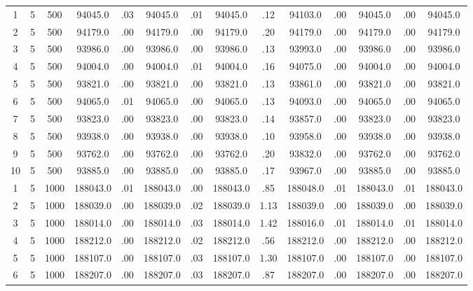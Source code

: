 \documentclass[12pt,a4paper]{article}
\begin{document}
\begin{center}
{\begin{tabular}{|ccc|cc|cc|cc|cc|cc|c|}
1             &   5& 500&  94045.0&  .03&  94045.0&  .01&  94045.0&  .12&  94103.0&  .00&  94045.0&  .00&  94045.0\\[-0.01in]
2             &   5& 500&  94179.0&  .00&  94179.0&  .00&  94179.0&  .20&  94179.0&  .00&  94179.0&  .00&  94179.0\\[-0.01in]
3             &   5& 500&  93986.0&  .00&  93986.0&  .00&  93986.0&  .13&  93993.0&  .00&  93986.0&  .00&  93986.0\\[-0.01in]
4             &   5& 500&  94004.0&  .00&  94004.0&  .01&  94004.0&  .16&  94075.0&  .00&  94004.0&  .00&  94004.0\\[-0.01in]
5             &   5& 500&  93821.0&  .00&  93821.0&  .00&  93821.0&  .13&  93861.0&  .00&  93821.0&  .00&  93821.0\\[-0.01in]
6             &   5& 500&  94065.0&  .01&  94065.0&  .00&  94065.0&  .13&  94093.0&  .00&  94065.0&  .00&  94065.0\\[-0.01in]
7             &   5& 500&  93823.0&  .00&  93823.0&  .00&  93823.0&  .14&  93857.0&  .00&  93823.0&  .00&  93823.0\\[-0.01in]
8             &   5& 500&  93938.0&  .00&  93938.0&  .00&  93938.0&  .10&  93958.0&  .00&  93938.0&  .00&  93938.0\\[-0.01in]
9             &   5& 500&  93762.0&  .00&  93762.0&  .00&  93762.0&  .20&  93832.0&  .00&  93762.0&  .00&  93762.0\\[-0.01in]
10            &   5& 500&  93885.0&  .00&  93885.0&  .00&  93885.0&  .17&  93967.0&  .00&  93885.0&  .00&  93885.0\\[-0.01in]
1             &   5&1000& 188043.0&  .01& 188043.0&  .00& 188043.0&  .85& 188048.0&  .01& 188043.0&  .01& 188043.0\\[-0.01in]
2             &   5&1000& 188039.0&  .00& 188039.0&  .02& 188039.0& 1.13& 188039.0&  .00& 188039.0&  .00& 188039.0\\[-0.01in]
3             &   5&1000& 188014.0&  .00& 188014.0&  .03& 188014.0& 1.42& 188016.0&  .01& 188014.0&  .01& 188014.0\\[-0.01in]
4             &   5&1000& 188212.0&  .00& 188212.0&  .02& 188212.0&  .56& 188212.0&  .00& 188212.0&  .00& 188212.0\\[-0.01in]
5             &   5&1000& 188107.0&  .00& 188107.0&  .03& 188107.0& 1.30& 188107.0&  .00& 188107.0&  .00& 188107.0\\[-0.01in]
6             &   5&1000& 188207.0&  .00& 188207.0&  .03& 188207.0&  .87& 188207.0&  .00& 188207.0&  .00& 188207.0\\[-0.01in]

\end{tabular}}
\end{center}
\end{document}
